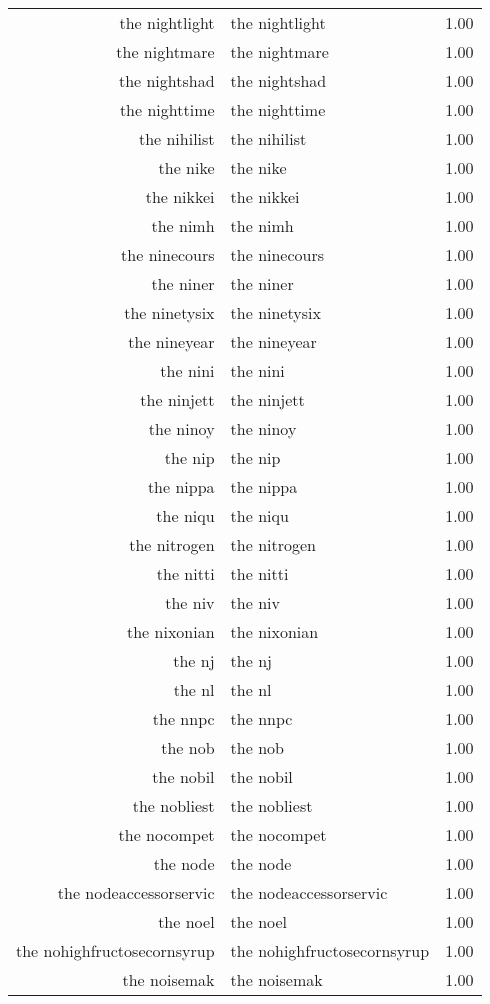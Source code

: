 \begin{table}[ht]
\begin{tabular}{rlr}
  the nightlight & the nightlight & 1.00 \\ 
  the nightmare & the nightmare & 1.00 \\ 
  the nightshad & the nightshad & 1.00 \\ 
  the nighttime & the nighttime & 1.00 \\ 
  the nihilist & the nihilist & 1.00 \\ 
  the nike & the nike & 1.00 \\ 
  the nikkei & the nikkei & 1.00 \\ 
  the nimh & the nimh & 1.00 \\ 
  the ninecours & the ninecours & 1.00 \\ 
  the niner & the niner & 1.00 \\ 
  the ninetysix & the ninetysix & 1.00 \\ 
  the nineyear & the nineyear & 1.00 \\ 
  the nini & the nini & 1.00 \\ 
  the ninjett & the ninjett & 1.00 \\ 
  the ninoy & the ninoy & 1.00 \\ 
  the nip & the nip & 1.00 \\ 
  the nippa & the nippa & 1.00 \\ 
  the niqu & the niqu & 1.00 \\ 
  the nitrogen & the nitrogen & 1.00 \\ 
  the nitti & the nitti & 1.00 \\ 
  the niv & the niv & 1.00 \\ 
  the nixonian & the nixonian & 1.00 \\ 
  the nj & the nj & 1.00 \\ 
  the nl & the nl & 1.00 \\ 
  the nnpc & the nnpc & 1.00 \\ 
  the nob & the nob & 1.00 \\ 
  the nobil & the nobil & 1.00 \\ 
  the nobliest & the nobliest & 1.00 \\ 
  the nocompet & the nocompet & 1.00 \\ 
  the node & the node & 1.00 \\ 
  the nodeaccessorservic & the nodeaccessorservic & 1.00 \\ 
  the noel & the noel & 1.00 \\ 
  the nohighfructosecornsyrup & the nohighfructosecornsyrup & 1.00 \\ 
  the noisemak & the noisemak & 1.00 \\ 

\end{tabular}
\end{table}
